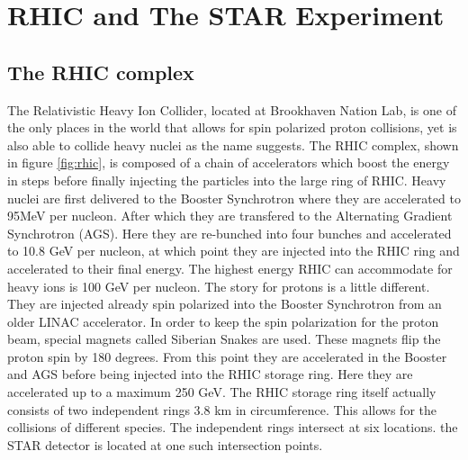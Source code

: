 \documentclass[abstract = on,listof=totoc, bibliography=totoc]{scrreprt}
\begin{document}
\chapter{RHIC and The STAR Experiment}

\section{The RHIC complex}
The Relativistic Heavy Ion Collider, located at Brookhaven Nation Lab, is one of the only places in the world that allows for spin polarized proton collisions, yet is also able to collide heavy nuclei as the name suggests. The RHIC complex, shown in figure \ref{fig:rhic}, is composed of a chain of accelerators which boost the energy in steps before finally injecting the particles into the large ring of RHIC. Heavy nuclei are first delivered to the Booster Synchrotron where they are accelerated to 95MeV per nucleon. After which they are transfered to the Alternating Gradient Synchrotron (AGS). Here they are re-bunched into four bunches and accelerated to 10.8 GeV per nucleon, at which point they are injected into the RHIC ring and accelerated to their final energy. The highest energy RHIC can accommodate for heavy ions is 100 GeV per nucleon. 
The story for protons is a little different. They are injected already spin polarized into the Booster Synchrotron from an older LINAC accelerator. In order to keep the spin polarization for the proton beam, special magnets called Siberian Snakes are used. These magnets flip the proton spin by 180 degrees. From this point they are accelerated in the Booster and AGS before being injected into the RHIC storage ring. Here they are accelerated up to a maximum 250 GeV. 
The RHIC storage ring itself actually consists of two independent rings 3.8 km in circumference. This allows for the collisions of different species. The independent rings intersect at six locations. the STAR detector is located at one such intersection points\cite{RHICoverview}.
\end{document}
